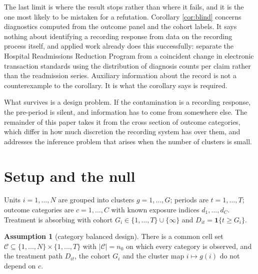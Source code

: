 \documentclass[12pt]{article}
\theoremstyle{definition}
\newtheorem{assumption}{Assumption}
\numberwithin{equation}{section}
\begin{document}
The last limit is where the result stops rather than where it fails, and it is
the one most likely to be mistaken for a refutation. Corollary \ref{cor:blind}
concerns diagnostics computed from the outcome panel and the cohort labels. It
says nothing about identifying a recording response from data on the recording
process itself, and applied work already does this successfully:
\citet{ody2019readmissions} separate the Hospital Readmissions Reduction Program
from a coincident change in electronic transaction standards using the
distribution of diagnosis counts per claim rather than the readmission series.
Auxiliary information about the record is not a counterexample to the corollary.
It is what the corollary says is required.

What survives is a design problem. If the contamination is a recording response,
the pre-period is silent, and information has to come from somewhere else. The
remainder of this paper takes it from the cross section of outcome categories,
which differ in how much discretion the recording system has over them, and
addresses the inference problem that arises when the number of clusters is
small.

\section{Setup and the null}
\label{sec:setup}

Units $i = 1,\dots,N$ are grouped into clusters $g = 1,\dots,G$; periods are
$t = 1,\dots,T$; outcome categories are $c = 1,\dots,C$ with known exposure
indices $d_1,\dots,d_C$. Treatment is absorbing with cohort $G_i \in
\{1,\dots,T\} \cup \{\infty\}$ and $D_{it} = \mathbf{1}\{t \ge G_i\}$.

\begin{assumption}[category balanced design]
\label{as:B}
There is a common cell set $\mathcal{C} \subseteq \{1,\dots,N\} \times
\{1,\dots,T\}$ with $|\mathcal{C}| = n_0$ on which every category is observed,
and the treatment path $D_{it}$, the cohort $G_i$ and the cluster map $i \mapsto
g(i)$ do not depend on $c$.
\end{assumption}
\end{document}
